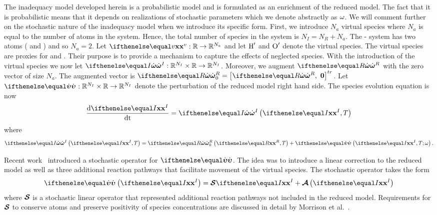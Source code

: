 \documentclass[fontsize=12pt, %
               paper=a4, %
               hyperref]{report}
\begin{document}
  
  The inadequacy model developed herein is a probabilistic model and is
  formulated as an enrichment of the reduced model.  The fact that it is
  probabilistic means that it depends on realizations of stochastic
  parameters which we denote abstractly as $\omega$.  We will comment
  further on the stochastic nature of the inadequacy model when we
  introduce its specific form.  First, we introduce $N_{a}$ virtual
  species where $N_{a}$ is equal to the number of atoms in the system.
  Hence, the total number of species in the system is $N_{I} = N_{R} +
  N_{a}$.  The - system has two atoms ( and )
  and so $N_{a} = 2$.  Let $\xc[v] : \mathbb{R} \to \mathbb{R}^{N_{a}}$
  and let $\ce{H^{\prime}}$ and $\ce{O^{\prime}}$ denote the virtual
  species.  The virtual species are proxies for  and .
  Their purpose is to provide a mechanism to capture the effects of
  neglected species.  With the introduction of the virtual species we
  now let $\rr[I] : \mathbb{R}^{N_{I}}\times\mathbb{R} \to
  \mathbb{R}^{N_{I}}$.  Moreover, we augment $\rr[R]$ with the zero
  vector of size $N_{a}$.  The augmented vector is $\rr[R]_{0} =
  \left[\rr[R], \ \mathbf{0}\right]^{tr}$.  Let $\rri :
  \mathbb{R}^{N_{I}}\times\mathbb{R} \to \mathbb{R}^{N_{I}}$ denote the
  perturbation of the reduced model right hand side.  The species
  evolution equation is now
  \begin{align}
    \odeone{\xc[I]}{\time} = \rr[I]\lr{\xc[I], T} \label{eq:ode_inad}
  \end{align}
  where 
  \begin{align}
    \rr[I]\lr{\xc[I], T} = \rr[R]_{0}\lr{\xc[R], T} + \rri\lr{\xc[I], T; \rz}. \label{eq:rr_inad}
  \end{align}
  
  Recent work~\cite{morrison2016representing} introduced a stochastic operator for $\rri$.  The 
  idea was to introduce a linear correction to the reduced model as well as three additional 
  reaction pathways that facilitate movement of the virtual species.  The stochastic operator 
  takes the form
  \begin{align}
    \rri\lr{\xc[I]} = \Sop\xc[I] + \Aop\lr{\xc[I]} \label{eq:inad_model_noT}
  \end{align}
  where $\boldsymbol{\mathcal{S}}$ is a stochastic linear operator that represented
  additional reaction pathways not included in the reduced model.
  Requirements for $\boldsymbol{\mathcal{S}}$ to conserve atoms and preserve positivity of
  species concentrations are discussed in detail by Morrison et
  al.~\cite{morrison2016representing}.  
  
\end{document}

